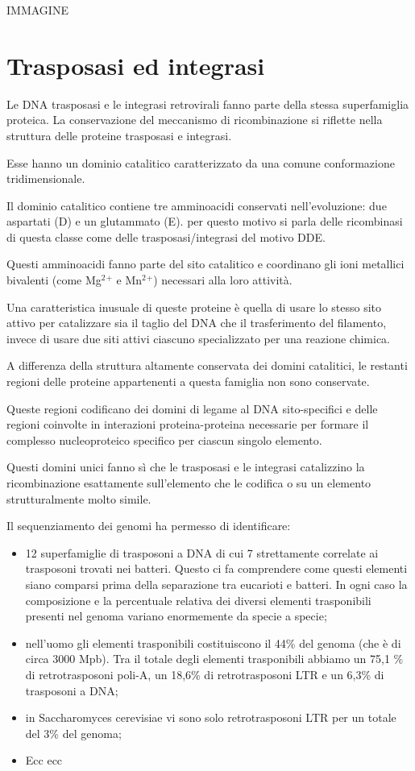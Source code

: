 \documentclass[11pt]{book}
\begin{document}
IMMAGINE

\section{Trasposasi ed integrasi}\label{trasposasi-ed-integrasi}

Le DNA trasposasi e le integrasi retrovirali fanno parte della stessa
superfamiglia proteica. La conservazione del meccanismo di
ricombinazione si riflette nella struttura delle proteine trasposasi e
integrasi.

Esse hanno un dominio catalitico caratterizzato da una comune
conformazione tridimensionale.

Il dominio catalitico contiene tre amminoacidi conservati
nell'evoluzione: due aspartati (D) e un glutammato (E). per questo
motivo si parla delle ricombinasi di questa classe come delle
trasposasi/integrasi del motivo DDE.

Questi amminoacidi fanno parte del sito catalitico e coordinano gli ioni
metallici bivalenti (come Mg\(^2\)\(^+\) e Mn\(^2\)\(^+\)) necessari
alla loro attività.

Una caratteristica inusuale di queste proteine è quella di usare lo
stesso sito attivo per catalizzare sia il taglio del DNA che il
trasferimento del filamento, invece di usare due siti attivi ciascuno
specializzato per una reazione chimica.

A differenza della struttura altamente conservata dei domini catalitici,
le restanti regioni delle proteine appartenenti a questa famiglia non
sono conservate.

Queste regioni codificano dei domini di legame al DNA sito-specifici e
delle regioni coinvolte in interazioni proteina-proteina necessarie per
formare il complesso nucleoproteico specifico per ciascun singolo
elemento.

Questi domini unici fanno sì che le trasposasi e le integrasi
catalizzino la ricombinazione esattamente sull'elemento che le codifica
o su un elemento strutturalmente molto simile.

Il sequenziamento dei genomi ha permesso di identificare:

\begin{itemize}
\itemsep1pt\parskip0pt
\item
  12 superfamiglie di trasposoni a DNA di cui 7 strettamente correlate
  ai trasposoni trovati nei batteri. Questo ci fa comprendere come
  questi elementi siano comparsi prima della separazione tra eucarioti e
  batteri. In ogni caso la composizione e la percentuale relativa dei
  diversi elementi trasponibili presenti nel genoma variano enormemente
  da specie a specie;
\item
  nell'uomo gli elementi trasponibili costituiscono il 44\% del genoma
  (che è di circa 3000 Mpb). Tra il totale degli elementi trasponibili
  abbiamo un 75,1 \% di retrotrasposoni poli-A, un 18,6\% di
  retrotrasposoni LTR e un 6,3\% di trasposoni a DNA;
\item
  in Saccharomyces cerevisiae vi sono solo retrotrasposoni LTR per un
  totale del 3\% del genoma;
\item
  Ecc ecc
\end{itemize}
\end{document}
